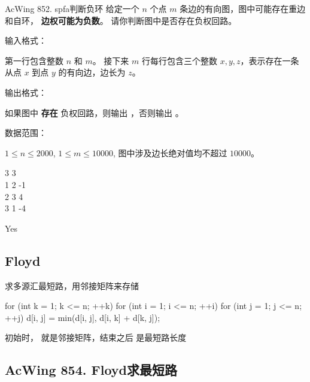 \begin{titledbox}{AcWing 852. spfa判断负环}
    给定一个 $n$ 个点 $m$ 条边的有向图，图中可能存在重边和自环， \textbf{边权可能为负数}。 请你判断图中是否存在负权回路。

    输入格式：

    第一行包含整数 $n$ 和 $m$。 接下来 $m$ 行每行包含三个整数 $x,y,z$，表示存在一条从点 $x$ 到点 $y$ 的有向边，边长为 $z$。

    输出格式：

    如果图中 \textbf{存在} 负权回路，则输出 ，否则输出 。

    数据范围：

    $1 \le n \le 2000$, $1 \le m \le 10000$, 图中涉及边长绝对值均不超过 $10000$。

    \begin{inputblock}
        3 3 \\
        1 2 -1 \\
        2 3 4 \\
        3 1 -4
    \end{inputblock}
    \begin{outputblock}
        Yes
    \end{outputblock}
\end{titledbox}

\subsection{Floyd}
求多源汇最短路，用邻接矩阵来存储 

\begin{mycpponecol}[Floyd算法]
    for (int k = 1; k <= n; ++k) {
        for (int i = 1; i <= n; ++i) {
            for (int j = 1; j <= n; ++j) {
                d[i, j] = min(d[i, j], d[i, k] + d[k, j]);
            }
        }
    }
\end{mycpponecol}

初始时，  就是邻接矩阵，结束之后  是最短路长度

\subsection{AcWing 854. Floyd求最短路}

